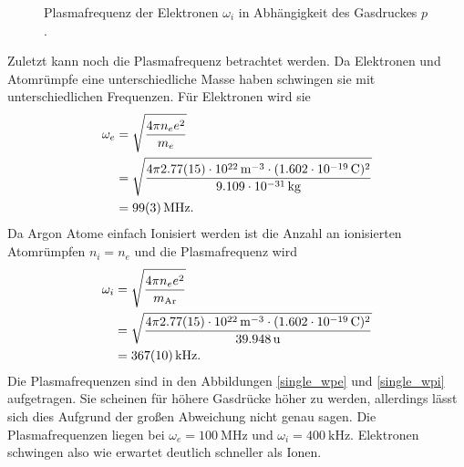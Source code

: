 \begin{figure}[htbp]
\centering

\caption{
    Plasmafrequenz der Elektronen $\omega_i$ in Abh\"angigkeit des Gasdruckes $p$.
}
\label{single_wpi}
\end{figure}

Zuletzt kann noch die Plasmafrequenz betrachtet werden.
Da Elektronen und Atomr\"umpfe eine unterschiedliche Masse haben schwingen sie mit unterschiedlichen Frequenzen.
F\"ur Elektronen wird sie
\begin{align}
\omega_e
    &=\sqrt{\frac{4\pi n_e e^2}{m_e}}
    \label{swpe}\\
    &=\sqrt{\frac{4\pi \siAnea \cdot(\sie)^2}{\sime}}\nonumber\\
    &=\siAwpea .\nonumber
\end{align}
Da Argon Atome einfach Ionisiert werden ist die Anzahl an ionisierten Atomr\"umpfen $n_i=n_e$ und die Plasmafrequenz wird
\begin{align}
\omega_i
    &=\sqrt{\frac{4\pi n_e e^2}{m_\text{Ar}}}
    \label{swpe}\\
    &=\sqrt{\frac{4\pi \siAnea \cdot(\sie)^2}{\simAr}}\nonumber\\
    &=\siAwpia .\nonumber
\end{align}
Die Plasmafrequenzen sind in den Abbildungen \vref{single_wpe} und \vref{single_wpi} aufgetragen.
Sie scheinen f\"ur h\"ohere Gasdr\"ucke h\"oher zu werden, allerdings l\"asst sich dies Aufgrund der gro\ss en Abweichung nicht genau sagen.
Die Plasmafrequenzen liegen bei $\omega_e=\SI{100}{\mega\hertz}$ und $\omega_i=\SI{400}{\kilo\hertz}$.
Elektronen schwingen also wie erwartet deutlich schneller als Ionen.